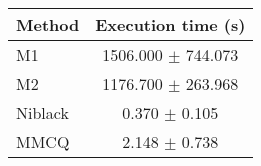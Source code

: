 \begin{tabular}{lc}
\hline
Method & Execution time (s) \\ \hline
M1 & 1506.000 $\pm$ 744.073 \\
M2 & 1176.700 $\pm$ 263.968 \\
Niblack & 0.370 $\pm$ 0.105 \\
MMCQ & 2.148 $\pm$ 0.738 \\ \hline
\end{tabular}

